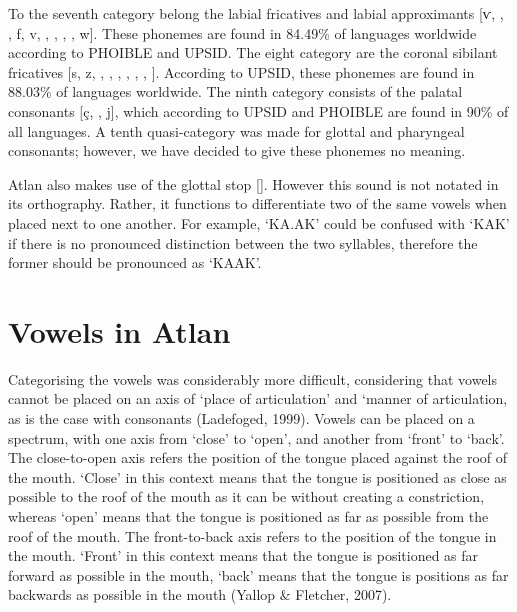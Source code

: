 To the seventh category belong the labial fricatives and labial approximants [ⱱ, \textphi, \textbeta, f, v, \texttheta, \dh, \textscriptv , \textturnw, w]. These phonemes are found in 84.49\% of languages worldwide according to PHOIBLE and UPSID. The eight category are the coronal sibilant fricatives [s, z, \textesh, \textyogh, \textrtails , \textrtailz, \textctc, \textctz,  \texththeng]. According to UPSID, these phonemes are found in 88.03\% of languages worldwide. The ninth category consists of the palatal consonants [\c{c}, \textctj, j], which according to UPSID and PHOIBLE are found in 90\% of all languages. A tenth quasi-category was made for glottal and pharyngeal consonants; however, we have decided to give these phonemes no meaning. 

Atlan also makes use of the glottal stop [\textglotstop]. However this sound is not notated in its orthography. Rather, it functions to differentiate two of the same vowels when placed next to one another. For example, ‘KA.AK’ could be confused with ‘KAK’ if there is no pronounced distinction between the two syllables, therefore the former should be pronounced as ‘KA\textglotstop AK’. 


\section{Vowels in Atlan}

Categorising the vowels was considerably more difficult, considering that vowels cannot be placed on an axis of ‘place of articulation’ and ‘manner of articulation, as is the case with consonants (Ladefoged, 1999). Vowels can be placed on a spectrum, with one axis from ‘close’ to ‘open’, and another from ‘front’ to ‘back’. The close-to-open axis refers the position of the tongue placed against the roof of the mouth. ‘Close’ in this context means that the tongue is positioned as close as possible to the roof of the mouth as it can be without creating a constriction, whereas ‘open’ means that the tongue is positioned as far as possible from the roof of the mouth. The front-to-back axis refers to the position of the tongue in the mouth. ‘Front’ in this context means that the tongue is positioned as far forward as possible in the mouth, ‘back’ means that the tongue is positions as far backwards as possible in the mouth (Yallop \& Fletcher, 2007). 

